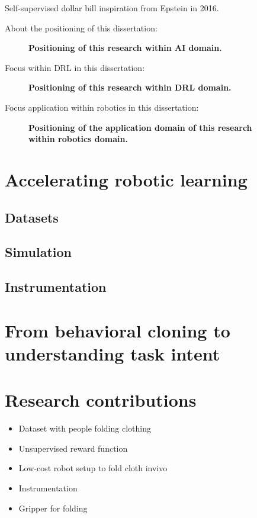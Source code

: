 \documentclass[\home/main.tex]{subfiles}
\begin{document}
Self-supervised dollar bill inspiration from Epstein in 2016.


About the positioning of this dissertation:
\begin{figure}[htbp!]
    \centering
    
    
    \caption{\textbf{Positioning of this research within AI domain.}}
    \label{fig:venn_positioning_thesis}
\end{figure}

Focus within \gls{DRL} in this dissertation:
\begin{figure}[htb]
    \centering
        
    \caption{\textbf{Positioning of this research within DRL domain.}}
    \label{fig:RL_loop_positioning}
\end{figure}

Focus application within robotics in this dissertation:
\begin{figure}[htb]
    \centering
        
    \caption{\textbf{Positioning of the application domain of this research within robotics domain.}}
    \label{fig:RL_loop_positioning}
\end{figure}

\section{Accelerating robotic learning}
\subsection{Datasets}
\subsection{Simulation}
\subsection{Instrumentation}
\section{From behavioral cloning to understanding task intent}
\section{Research contributions} \label{sec:intro_contributions}
\begin{itemize}
    \item Dataset with people folding clothing
    \item Unsupervised reward function
    \item Low-cost robot setup to fold cloth invivo
    \item Instrumentation
    \item Gripper for folding
\end{itemize}
\end{document}
